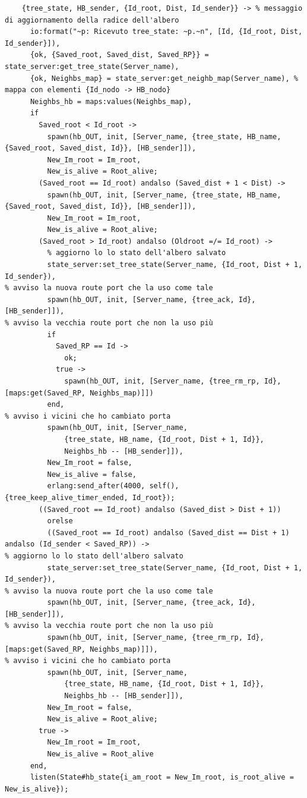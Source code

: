 \documentclass[italian]{memoir}
\begin{document}
\begin{verbatim}
    {tree_state, HB_sender, {Id_root, Dist, Id_sender}} -> % messaggio di aggiornamento della radice dell'albero
      io:format("~p: Ricevuto tree_state: ~p.~n", [Id, {Id_root, Dist, Id_sender}]),
      {ok, {Saved_root, Saved_dist, Saved_RP}} = state_server:get_tree_state(Server_name),
      {ok, Neighbs_map} = state_server:get_neighb_map(Server_name), % mappa con elementi {Id_nodo -> HB_nodo}
      Neighbs_hb = maps:values(Neighbs_map),
      if
        Saved_root < Id_root ->
          spawn(hb_OUT, init, [Server_name, {tree_state, HB_name, {Saved_root, Saved_dist, Id}}, [HB_sender]]),
          New_Im_root = Im_root,
          New_is_alive = Root_alive;
        (Saved_root == Id_root) andalso (Saved_dist + 1 < Dist) ->
          spawn(hb_OUT, init, [Server_name, {tree_state, HB_name, {Saved_root, Saved_dist, Id}}, [HB_sender]]),
          New_Im_root = Im_root,
          New_is_alive = Root_alive;
        (Saved_root > Id_root) andalso (Oldroot =/= Id_root) ->
          % aggiorno lo lo stato dell'albero salvato
          state_server:set_tree_state(Server_name, {Id_root, Dist + 1, Id_sender}),
% avviso la nuova route port che la uso come tale
          spawn(hb_OUT, init, [Server_name, {tree_ack, Id}, [HB_sender]]),
% avviso la vecchia route port che non la uso più
          if
            Saved_RP == Id ->
              ok;
            true ->
              spawn(hb_OUT, init, [Server_name, {tree_rm_rp, Id}, [maps:get(Saved_RP, Neighbs_map)]])
          end,
% avviso i vicini che ho cambiato porta
          spawn(hb_OUT, init, [Server_name, 
              {tree_state, HB_name, {Id_root, Dist + 1, Id}},
              Neighbs_hb -- [HB_sender]]),
          New_Im_root = false,
          New_is_alive = false,
          erlang:send_after(4000, self(), {tree_keep_alive_timer_ended, Id_root});
        ((Saved_root == Id_root) andalso (Saved_dist > Dist + 1))
          orelse
          ((Saved_root == Id_root) andalso (Saved_dist == Dist + 1) andalso (Id_sender < Saved_RP)) ->
% aggiorno lo lo stato dell'albero salvato
          state_server:set_tree_state(Server_name, {Id_root, Dist + 1, Id_sender}),
% avviso la nuova route port che la uso come tale
          spawn(hb_OUT, init, [Server_name, {tree_ack, Id}, [HB_sender]]),
% avviso la vecchia route port che non la uso più
          spawn(hb_OUT, init, [Server_name, {tree_rm_rp, Id}, [maps:get(Saved_RP, Neighbs_map)]]),
% avviso i vicini che ho cambiato porta
          spawn(hb_OUT, init, [Server_name, 
              {tree_state, HB_name, {Id_root, Dist + 1, Id}}, 
              Neighbs_hb -- [HB_sender]]),
          New_Im_root = false,
          New_is_alive = Root_alive;
        true ->
          New_Im_root = Im_root,
          New_is_alive = Root_alive
      end,
      listen(State#hb_state{i_am_root = New_Im_root, is_root_alive = New_is_alive});
\end{verbatim}
\end{document}
